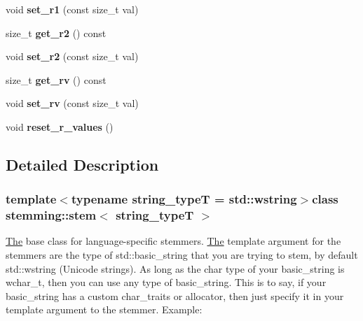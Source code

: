 \begin{DoxyCompactItemize}
\item 
\hypertarget{group___stemming_ga87fa173343063b5e85722edefe493ab5}{void {\bfseries set\-\_\-r1} (const size\-\_\-t val)}\label{group___stemming_ga87fa173343063b5e85722edefe493ab5}

\item 
\hypertarget{group___stemming_ga90aba2c99e1fa12883eba32211089f3b}{size\-\_\-t {\bfseries get\-\_\-r2} () const }\label{group___stemming_ga90aba2c99e1fa12883eba32211089f3b}

\item 
\hypertarget{group___stemming_ga032bb774988c5b8f6fae7cf28b59d485}{void {\bfseries set\-\_\-r2} (const size\-\_\-t val)}\label{group___stemming_ga032bb774988c5b8f6fae7cf28b59d485}

\item 
\hypertarget{group___stemming_gaefa75f006e0b4b623a2608dc23dff605}{size\-\_\-t {\bfseries get\-\_\-rv} () const }\label{group___stemming_gaefa75f006e0b4b623a2608dc23dff605}

\item 
\hypertarget{group___stemming_ga1fda692e873dfcae7048679ffdb29a5e}{void {\bfseries set\-\_\-rv} (const size\-\_\-t val)}\label{group___stemming_ga1fda692e873dfcae7048679ffdb29a5e}

\item 
\hypertarget{group___stemming_gacefba08458c6a8cc00a733afb3a064ed}{void {\bfseries reset\-\_\-r\-\_\-values} ()}\label{group___stemming_gacefba08458c6a8cc00a733afb3a064ed}

\end{DoxyCompactItemize}


\subsection{Detailed Description}
\subsubsection*{template$<$typename string\-\_\-type\-T = std\-::wstring$>$class stemming\-::stem$<$ string\-\_\-type\-T $>$}

\hyperlink{class_the}{The} base class for language-\/specific stemmers. \hyperlink{class_the}{The} template argument for the stemmers are the type of std\-::basic\-\_\-string that you are trying to stem, by default std\-::wstring (Unicode strings). As long as the char type of your basic\-\_\-string is wchar\-\_\-t, then you can use any type of basic\-\_\-string. This is to say, if your basic\-\_\-string has a custom char\-\_\-traits or allocator, then just specify it in your template argument to the stemmer. Example\-: 


